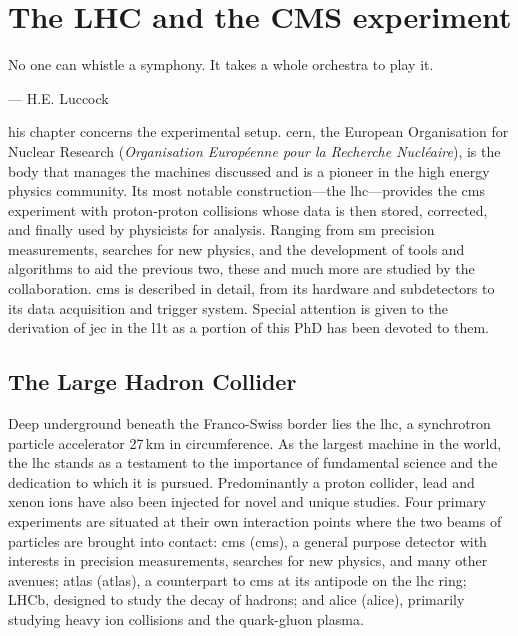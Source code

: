 \chapter{The LHC and the CMS experiment}
\label{chap:detector}

\epigraph{No one can whistle a symphony. It takes a whole orchestra to play it.}{--- H.E. Luccock}

his chapter concerns the experimental setup. \acrshort{cern}, the European Organisation for Nuclear Research (\emph{Organisation Europ\'{e}enne pour la Recherche Nucl\'{e}aire}), is the body that manages the machines discussed and is a pioneer in the high energy physics community. Its most notable construction---the \acrlong{lhc}---provides the \acrshort{cms} experiment with proton-proton collisions whose data is then stored, corrected, and finally used by physicists for analysis. Ranging from \acrlong{sm} precision measurements, searches for new physics, and the development of tools and algorithms to aid the previous two, these and much more are studied by the collaboration. \acrshort{cms} is described in detail, from its hardware and subdetectors to its data acquisition and trigger system. Special attention is given to the derivation of \acrfull{jec} in the \acrfull{l1t} as a portion of this PhD has been devoted to them.




\section{The Large Hadron Collider}
\label{sec:detector_lhc}

Deep underground beneath the Franco-Swiss border lies the \acrfull{lhc}, a synchrotron particle accelerator 27\,km in circumference. As the largest machine in the world, the \acrshort{lhc} stands as a testament to the importance of fundamental science and the dedication to which it is pursued. Predominantly a proton collider, lead and xenon ions have also been injected for novel and unique studies. Four primary experiments are situated at their own interaction points where the two beams of particles are brought into contact: \acrshort{cms} (\acrlong{cms}), a general purpose detector with interests in precision measurements, searches for new physics, and many other avenues; \acrshort{atlas} (\acrlong{atlas}), a counterpart to \acrshort{cms} at its antipode on the \acrshort{lhc} ring; LHCb, designed to study the decay of \PB hadrons; and \acrshort{alice} (\acrlong{alice}), primarily studying heavy ion collisions and the quark-gluon plasma.

